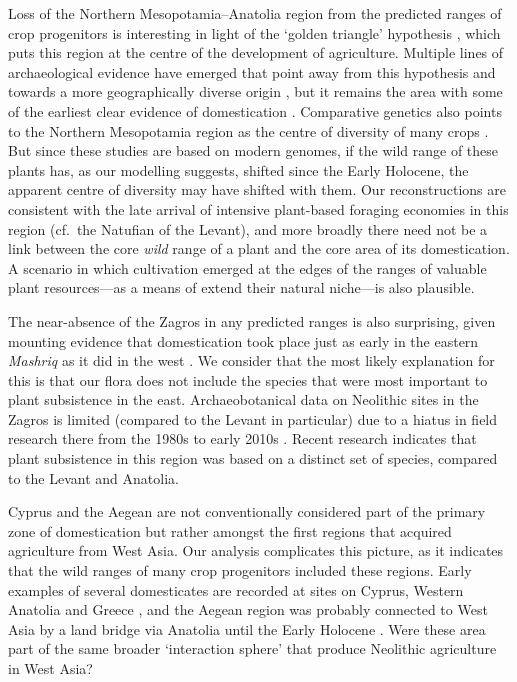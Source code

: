 \documentclass[
  authoryear,
  preprint]{elsarticle}
\begin{document}
Loss of the Northern Mesopotamia--Anatolia region from the predicted
ranges of crop progenitors is interesting in light of the `golden
triangle' hypothesis
\citep{Lev-YadunEtAl2000, KozlowskiAurenche2005, AbboEtAl2010}, which
puts this region at the centre of the development of agriculture.
Multiple lines of archaeological evidence have emerged that point away
from this hypothesis and towards a more geographically diverse origin
\citep{Asouti2006, FullerEtAl2011, ArranzOtaeguiEtAl2016}, but it
remains the area with some of the earliest clear evidence of
domestication \citep{ZoharyEtAl2012, KabukcuEtAl2021, UlasEtAl2024}.
Comparative genetics also points to the Northern Mesopotamia region as
the centre of diversity of many crops \citep[e.g.][]{HaasEtAl2019}. But
since these studies are based on modern genomes, if the wild range of
these plants has, as our modelling suggests, shifted since the Early
Holocene, the apparent centre of diversity may have shifted with them.
Our reconstructions are consistent with the late arrival of intensive
plant-based foraging economies in this region (cf.~the Natufian of the
Levant), and more broadly there need not be a link between the core
\emph{wild} range of a plant and the core area of its domestication. A
scenario in which cultivation emerged at the edges of the ranges of
valuable plant resources---as a means of extend their natural niche---is
also plausible.

The near-absence of the Zagros in any predicted ranges is also
surprising, given mounting evidence that domestication took place just
as early in the eastern \emph{Mashriq} as it did in the west
\citep{Zeder2024}. We consider that the most likely explanation for this
is that our flora does not include the species that were most important
to plant subsistence in the east. Archaeobotanical data on Neolithic
sites in the Zagros is limited (compared to the Levant in particular)
due to a hiatus in field research there from the 1980s to early 2010s
\citep{Zeder2024}. Recent research
\citep{WhitlamEtAl2018, GonzalezCarreteroEtAl2023} indicates that plant
subsistence in this region was based on a distinct set of species,
compared to the Levant and Anatolia.

Cyprus and the Aegean are not conventionally considered part of the
primary zone of domestication but rather amongst the first regions that
acquired agriculture from West Asia. Our analysis complicates this
picture, as it indicates that the wild ranges of many crop progenitors
included these regions. Early examples of several domesticates are
recorded at sites on Cyprus, Western Anatolia and Greece
\citep{ArranzOtaeguiRoe2023}, and the Aegean region was probably
connected to West Asia by a land bridge via Anatolia until the Early
Holocene \citep{AksuHiscott2022}. Were these area part of the same
broader `interaction sphere' that produce Neolithic agriculture in West
Asia?
\end{document}
